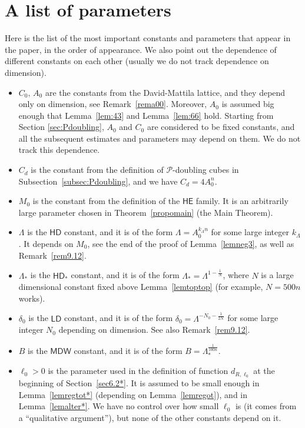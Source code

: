 \documentclass[11pt]{amsart}
\newcommand{\PP}{{\mathcal P}}
\newcommand{\HE}{{\mathsf {HE}}}
\newcommand{\HD}{{\mathsf{HD}}}
\newcommand{\LD}{{\mathsf{LD}}}
\newcommand{\MDW}{{\mathsf{MDW}}}
\theoremstyle{definition}
\theoremstyle{remark}
\numberwithin{equation}{section}
\begin{document}
\appendix\section{A list of parameters}\label{app:param}
Here is the list of the most important constants and parameters that appear in the paper, in the order of appearance. We also point out the dependence of different constants on each other (usually we do not track dependence on dimension).
\begin{itemize}
	\item $C_0,\, A_0$ are the constants from the David-Mattila lattice, and they depend only on dimension, see Remark~\ref{rema00}. Moreover, $A_0$ is assumed big enough that Lemma~\ref{lem:43} and Lemma~\ref{lem:66} hold. Starting from Section \ref{sec:Pdoubling}, $A_0$ and $C_0$ are considered to be fixed constants, and all the subsequent estimates and parameters may depend on them. We do not track this dependence.
	\item $C_d$ is the constant from the definition of $\PP$-doubling cubes in Subsection~\ref{subsec:Pdoubling}, and we have $C_d =4A_0^n$.
	\item $M_0$ is the constant from the definition of the $\HE$ family. It is an arbitrarily large parameter chosen in Theorem~\ref{propomain} (the Main Theorem).
	\item $\Lambda$ is the $\HD$ constant, and it is of the form $\Lambda = A_0^{k_{\Lambda}n}$ for some large integer $k_{\Lambda}$. It depends on $M_0$, see the end of the proof of Lemma~\ref{lemneg3}, as well as Remark~\ref{rem9.12}.
	\item $\Lambda_*$ is the $\HD_*$ constant, and it is of the form $\Lambda_* = \Lambda^{1-\frac1N}$, where $N$ is a large dimensional constant fixed above Lemma~\ref{lemtoptop} (for example, $N=500n$ works).
	\item $\delta_0$ is the $\LD$ constant, and it is of the form $\delta_0 = \Lambda^{-N_0 - \frac{1}{2N}}$ for some large integer $N_0$ depending on dimension. See also Remark~\ref{rem9.12}.
	\item $B$ is the $\MDW$ constant, and it is of the form $B=\Lambda_*^{\frac{1}{100n}}.$
	\item $\ell_0>0$ is the parameter used in the definition of function $d_{R,\ell_0}$ at the beginning of Section~\ref{sec6.2*}. It is assumed to be small enough in Lemma~\ref{lemregtot*} (depending on Lemma~\ref{lemregot}), and in Lemma~\ref{lemalter*}. We have no control over how small $\ell_0$ is (it comes from a ``qualitative argument''), but none of the other constants depend on it.

\end{itemize}
\end{document}
